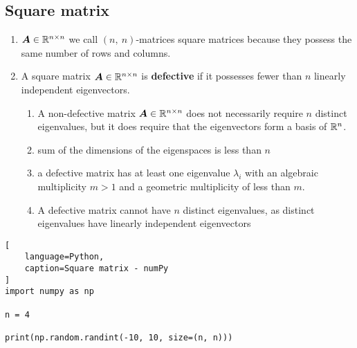 \subsection{Square matrix}

\begin{enumerate}
    \item $\bm{A} \in \mathbb{R}^{n\times n}$ we call $(n,\ n)$-matrices square matrices because they possess the same number of rows and columns.
    \hfill \cite{mfml/book/mml/Deisenroth-Faisal-Ong}

    \item
    \begin{definition}
        A square matrix $\bm{A} \in \mathbb{R}^{n\times n}$ is \textbf{defective} if it possesses  fewer than $n$ linearly independent eigenvectors.
        \hfill \cite{mfml/book/mml/Deisenroth-Faisal-Ong}
    \end{definition}
    \begin{enumerate}
        \item A non-defective matrix $\bm{A} \in \mathbb{R}^{n\times n}$ does not necessarily require $n$ distinct eigenvalues, but it does require that the eigenvectors form a basis of $\mathbb{R}^n$.
        \hfill \cite{mfml/book/mml/Deisenroth-Faisal-Ong}

        \item sum of the dimensions of the eigenspaces is less than $n$
        \hfill \cite{mfml/book/mml/Deisenroth-Faisal-Ong}

        \item a defective matrix has at least one eigenvalue $\lambda_i$ with an algebraic multiplicity $m > 1$ and a geometric multiplicity of less than $m$.
        \hfill \cite{mfml/book/mml/Deisenroth-Faisal-Ong}

        \item A defective matrix cannot have $n$ distinct eigenvalues, as distinct eigenvalues have linearly independent eigenvectors
        \hfill \cite{mfml/book/mml/Deisenroth-Faisal-Ong}
    \end{enumerate}
\end{enumerate}


\begin{lstlisting}[
    language=Python,
    caption=Square matrix - numPy
]
import numpy as np

n = 4

print(np.random.randint(-10, 10, size=(n, n)))
\end{lstlisting}


